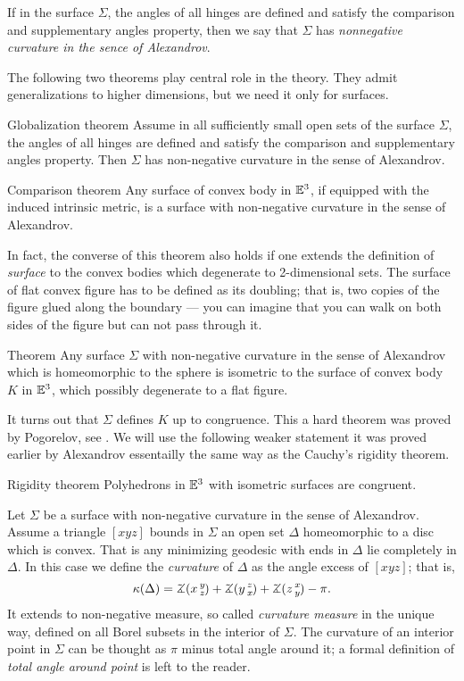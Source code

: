 \documentclass[oneside,a4paper, 12pt]{article}
\begin{document}
If in the surface $\Sigma$, the angles of all hinges are defined and satisfy 
the comparison and supplementary angles property, then we say that $\Sigma$
has \emph{nonnegative curvature in the sence of Alexandrov}.


The following two theorems play central role in the theory.
They admit generalizations to higher dimensions, but we need it only for surfaces.

\begin{thm}{Globalization theorem}\label{Globalization theorem}
Assume in all sufficiently small open sets of the surface $\Sigma$, the angles of all hinges are defined and satisfy 
the comparison and supplementary angles property.
Then $\Sigma$ has non-negative curvature in the sense of Alexandrov.
\end{thm}

\begin{thm}{Comparison theorem}\label{Comparison theorem}
Any surface of convex body in $\mathbb{E}^3$,
if equipped with the induced intrinsic metric, 
is a surface with non-negative curvature in the sense of Alexandrov.
\end{thm}

In fact, the converse of this theorem also holds
if one extends the definition of \emph{surface} 
to the convex bodies which degenerate to 2-dimensional sets.
The surface of flat convex figure has to be defined as its doubling;
that is, two copies 
of the figure glued along the boundary --- you can imagine that you can walk on both sides of the figure but can not pass through it.

\begin{thm}{Theorem}
Any surface $\Sigma$ with non-negative curvature in the sense of Alexandrov which is homeomorphic to the sphere
is isometric to the surface of convex body $K$ in $\mathbb{E}^3$,
which possibly degenerate to a flat figure.
\end{thm}

It turns out that $\Sigma$ defines $K$ up to congruence.
This a hard theorem was proved by Pogorelov, see \cite{pogorelov}.
We will use the following weaker statement
it was proved earlier by Alexandrov essentailly the same way as the Cauchy's rigidity theorem.

\begin{thm}{Rigidity theorem}
Polyhedrons in $\mathbb{E}^3$ with isometric surfaces are congruent. 
\end{thm}

Let $\Sigma$ be a surface with non-negative curvature in the sense of Alexandrov.
Assume a triangle $[xyz]$ bounds in $\Sigma$ an open set $\Delta$ homeomorphic to a disc which is convex.
That is any minimizing geodesic with ends in $\Delta$
lie completely in $\Delta$.
In this case we define the \emph{curvature} of $\Delta$ as the angle excess of $[xyz]$;
that is,
\[\kappa(\Delta)=\angk x y z+\angk  y z x+\angk z x y-\pi.\]
It extends to non-negative measure, so called \emph{curvature measure} in the unique way, defined on all Borel subsets in the interior of $\Sigma$.
The curvature of an interior point in $\Sigma$ can be thought as $\pi$ minus total angle around it;
a formal definition of \emph{total angle around point} is left to the reader.
\end{document}
